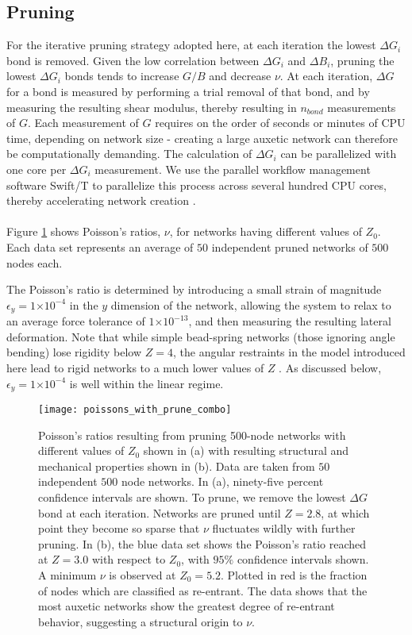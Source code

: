 \documentclass[9pt,twocolumn,twoside]{pnas-new}
\providecommand{\e}[1]{\ensuremath{\times 10^{#1}}}
\begin{document}
\subsection*{Pruning}
For the iterative pruning strategy adopted here, at each iteration the lowest $\Delta G_{i}$ bond is removed.  Given the low correlation between $\Delta G_{i}$ and $\Delta B_{i}$, pruning the lowest $\Delta G_{i}$ bonds tends to increase $G/B$ and decrease $\nu$.  At each iteration, $\Delta G$ for a bond is measured by performing a trial removal of that bond, and by measuring the resulting shear modulus, thereby resulting in $n_{bond}$ measurements of $G$.  Each measurement of $G$ requires on the order of seconds or minutes of CPU time, depending on network size - creating a large auxetic network can therefore be computationally demanding.   The calculation of $\Delta G_{i}$ can be parallelized with one core per $\Delta G_{i}$ measurement.  We use the parallel workflow management software Swift/T to parallelize this process across several hundred CPU cores, thereby accelerating network creation \cite{wozniak2013swift}.

\paragraph{}
Figure \ref{fig:poissons_with_prune_combo} shows Poisson's ratios, $\nu$, for networks having different values of $Z_{0}$.  Each data set represents an average of $50$ independent pruned networks of $500$ nodes each.

The Poisson's ratio is determined by introducing a small strain of magnitude  $\epsilon_{y}=1\e{-4}$ in the $y$ dimension of the network, allowing the system to relax to an average force tolerance of $1\e{-13}$, and then measuring the resulting lateral deformation. 
Note that while simple bead-spring networks (those ignoring angle bending) lose rigidity below $Z=4$, the angular restraints in the model introduced here lead to rigid networks to a much lower values of $Z$ .  As discussed below, $\epsilon_{y}=1\e{-4}$ is well within the linear regime.

\begin{figure}
	\centering
	\texttt{[image: poissons\_with\_prune\_combo]}
	\caption{Poisson's ratios resulting from pruning 500-node networks with different values of $Z_{0}$ shown in (a) with resulting structural and mechanical properties shown in (b). Data are taken from $50$ independent $500$ node networks. In (a), ninety-five percent confidence intervals are shown. To prune, we remove the lowest $\Delta G$ bond at each iteration.  Networks are pruned until $Z=2.8$, at which point they become so sparse that $\nu$ fluctuates wildly with further pruning. In (b), the blue data set shows the Poisson's ratio reached at $Z=3.0$ with respect to $Z_{0}$, with $95\%$ confidence intervals shown.  A minimum $\nu$ is observed at $Z_{0}=5.2$.  Plotted in red is the fraction of nodes which are classified as re-entrant.  The data shows that the most auxetic networks show the greatest degree of re-entrant behavior, suggesting a structural origin to $\nu$.}
	\label{fig:poissons_with_prune_combo}
\end{figure}
\end{document}
